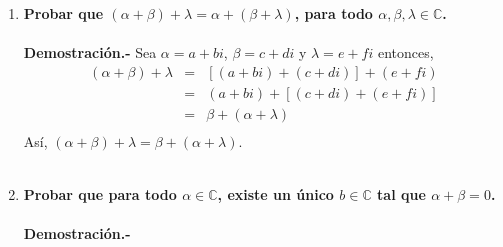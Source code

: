 \begin{multicols}{2}
\begin{enumerate}[\bfseries 1.]
    \item \textbf{\boldmath Probar que $(\alpha+\beta)+\lambda = \alpha + (\beta + \lambda)$, para todo $\alpha,\beta,\lambda \in \mathbb{C}$.}\\\\
	\textbf{Demostración.-}\; Sea $\alpha = a+bi$,  $\beta = c+di$ y $\lambda = e + fi$ entonces,
	$$\begin{array}{rcl}
	    (\alpha + \beta) + \lambda &=&\left[(a+bi)+(c+di)\right]+(e+fi)\\
				       &=&(a+bi)+\left[(c+di)+(e+fi)\right]\\
				       &=&\beta + (\alpha + \lambda)\\
	\end{array}$$
	Así, $(\alpha + \beta) + \lambda = \beta + (\alpha + \lambda).$\\\\


    \item \textbf{\boldmath Probar que para todo $\alpha \in \mathbb{C}$, existe un único $b\in \mathbb{C}$ tal que $\alpha + \beta = 0$.}\\\\
	\textbf{Demostración.-}\;


\end{enumerate}

\end{multicols}
